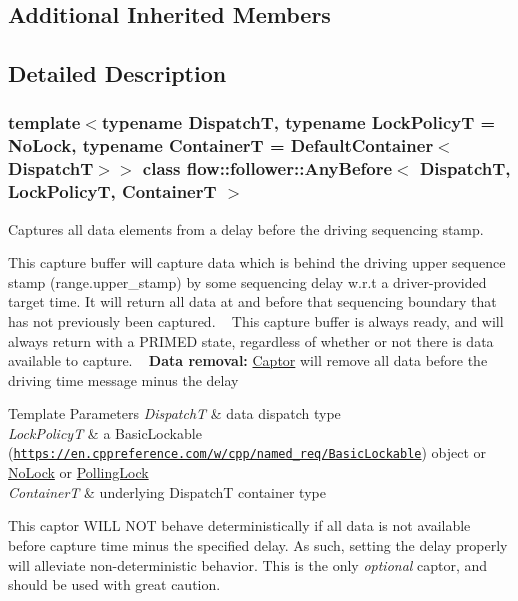 \subsection*{Additional Inherited Members}


\subsection{Detailed Description}
\subsubsection*{template$<$typename DispatchT, typename Lock\+PolicyT = No\+Lock, typename ContainerT = Default\+Container$<$\+Dispatch\+T$>$$>$\newline
class flow\+::follower\+::\+Any\+Before$<$ Dispatch\+T, Lock\+Policy\+T, Container\+T $>$}

Captures all data elements from a delay before the driving sequencing stamp. 

This capture buffer will capture data which is behind the driving upper sequence stamp ({\ttfamily range.\+upper\+\_\+stamp}) by some sequencing delay w.\+r.\+t a driver-\/provided target time. It will return all data at and before that sequencing boundary that has not previously been captured. ~\newline
 This capture buffer is always ready, and will always return with a P\+R\+I\+M\+ED state, regardless of whether or not there is data available to capture. ~\newline
 {\bfseries Data removal\+:} \hyperlink{classflow_1_1_captor}{Captor} will remove all data before the driving time message minus the delay


\begin{DoxyTemplParams}{Template Parameters}
{\em DispatchT} & data dispatch type \\
\hline
{\em Lock\+PolicyT} & a Basic\+Lockable (\href{https://en.cppreference.com/w/cpp/named_req/BasicLockable}{\tt https\+://en.\+cppreference.\+com/w/cpp/named\+\_\+req/\+Basic\+Lockable}) object or \hyperlink{structflow_1_1_no_lock}{No\+Lock} or \hyperlink{structflow_1_1_polling_lock}{Polling\+Lock} \\
\hline
{\em ContainerT} & underlying {\ttfamily DispatchT} container type\\
\hline
\end{DoxyTemplParams}
This captor W\+I\+LL N\+OT behave deterministically if all data is not available before capture time minus the specified delay. As such, setting the delay properly will alleviate non-\/deterministic behavior. This is the only {\itshape optional} captor, and should be used with great caution. 

